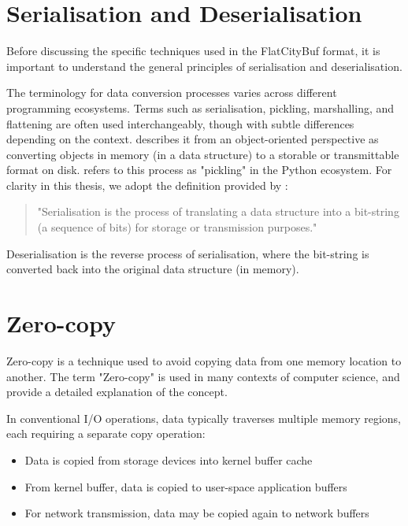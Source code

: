 \section{Serialisation and Deserialisation}
\label{tb:serialisation_deserialisation}
Before discussing the specific techniques used in the FlatCityBuf format, it is important to understand the general principles of serialisation and deserialisation.

The terminology for data conversion processes varies across different programming ecosystems. Terms such as serialisation, pickling, marshalling, and flattening are often used interchangeably, though with subtle differences depending on the context. \citet{cpp_serialization} describes it from an object-oriented perspective as converting objects in memory (in a data structure) to a storable or transmittable format on disk. \citet{py_serialization} refers to this process as "pickling" in the Python ecosystem. For clarity in this thesis, we adopt the definition provided by \citet{viotti_2022}:

\begin{quote}
  "Serialisation is the process of translating a data structure into a bit-string (a sequence of bits) for storage or transmission purposes."
\end{quote}

Deserialisation is the reverse process of serialisation, where the bit-string is converted back into the original data structure (in memory).

\section{Zero-copy}
\label{tb:zero_copy}
Zero-copy is a technique used to avoid copying data from one memory location to another. The term "Zero-copy" is used in many contexts of computer science, \citet{song2012performance}  and \citet{brose_2008_zerocopy} provide a detailed explanation of the concept.

In conventional I/O operations, data typically traverses multiple memory regions, each requiring a separate copy operation:

\begin{itemize}
  \item Data is copied from storage devices into kernel buffer cache
  \item From kernel buffer, data is copied to user-space application buffers
  \item For network transmission, data may be copied again to network buffers
\end{itemize}

